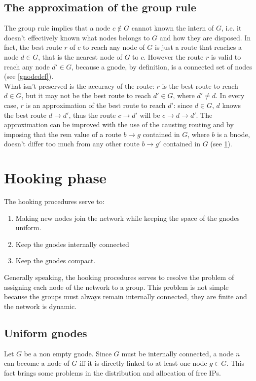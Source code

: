 \documentclass[a4paper]{article}
\begin{document}
\subsection{The approximation of the group rule}
\label{groupapprox}
The group rule implies that a node $c\notin G$ cannot known the
intern of $G$, i.e. it doesn't effectively known what nodes
belongs to $G$ and how they are disposed. In fact, the
best route $r$ of $c$ to reach any node of $G$ is just a route
that reaches a node $d\in G$, that is the nearest node of $G$
to $c$.
However the route $r$ is valid to reach any node $d'\in G$, because
a gnode, by definition, is a connected set of nodes (see
\ref{gnodedef}).\\
What isn't preserved is the accuracy of the route: $r$ is the
best route to reach $d\in G$, but it may not be the best route
to reach $d'\in G$, where $d'\neq d$. In every case, $r$ is an approximation
of the best route to reach $d'$: since $d\in G$, $d$ knows the best route
$d\rightarrow d'$, thus the route $c\rightarrow d'$ will be $c\rightarrow
d\rightarrow d'$.
The approximation can be improved with
the use of the causting routing \cite{caurout} and by imposing that the
rem value of a route $b\rightarrow g$ contained in $G$, where $b$ is a bnode, doesn't differ too much from
any other route $b\rightarrow g'$ contained in $G$ (see \ref{hooking}).

\section{Hooking phase}
\label{hooking}
The hooking procedures serve to:
\begin{enumerate}
	\item Making new nodes join the network while keeping the space of the
		gnodes uniform.
	\item Keep the gnodes internally connected
	\item Keep the gnodes compact.
\end{enumerate}

Generally speaking, the hooking procedures serves to resolve the problem of
assigning each node of the network to a group. This problem is not simple
because the groups must always remain internally connected, they are finite
and the network is dynamic.

\subsection{Uniform gnodes}
\label{groupednodeshook}
Let $G$ be a non empty gnode.
Since $G$ must be internally connected, a node $n$ can become a node of $G$
iff it is directly linked to at least one node $g\in G$. 
This fact brings some problems in the distribution and allocation of free
IPs.
\end{document}
